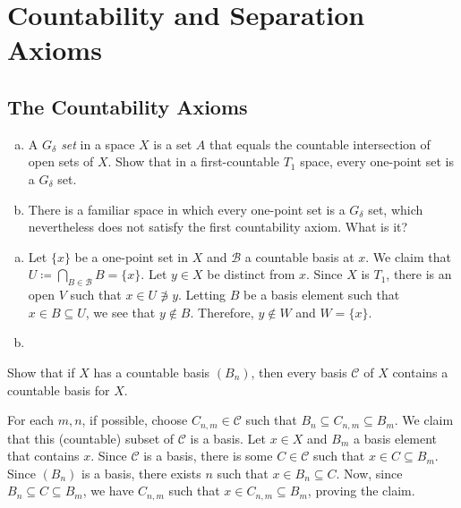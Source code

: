 \section{Countability and Separation Axioms}

\setcounter{subsection}{29}
\subsection{The Countability Axioms}

	\begin{exercise}
		\phantom{oh}
		\begin{enumerate}[(a)]
			\item A \textit{$G_\delta$ set} in a space $X$ is a set $A$ that equals the countable intersection of open sets of $X$. Show that in a first-countable $T_1$ space, every one-point set is a $G_\delta$ set.
			\item There is a familiar space in which every one-point set is a $G_\delta$ set, which nevertheless does not satisfy the first countability axiom. What is it?
		\end{enumerate}
	\end{exercise}
	\begin{solution*}
		\begin{enumerate}[(a)]
			\item Let $\{x\}$ be a one-point set in $X$ and $\mathcal{B}$ a countable basis at $x$. We claim that $U \coloneqq \bigcap_{B\in\mathcal{B}} B = \{x\}$. Let $y\in X$ be distinct from $x$. Since $X$ is $T_1$, there is an open $V$ such that $x\in U\not\ni y$. Letting $B$ be a basis element such that $x\in B\subseteq U$, we see that $y\not\in B$. Therefore, $y\not\in W$ and $W = \{x\}$.
			\item 
		\end{enumerate}
	\end{solution*}

	\begin{exercise}
		Show that if $X$ has a countable basis $(B_n)$, then every basis $\mathcal{C}$ of $X$ contains a countable basis for $X$.
	\end{exercise}
	\begin{solution*}
		For each $m,n$, if possible, choose $C_{n,m}\in\mathcal{C}$ such that $B_n\subseteq C_{n,m}\subseteq B_m$. We claim that this (countable) subset of $\mathcal{C}$ is a basis. Let $x\in X$ and $B_m$ a basis element that contains $x$. Since $\mathcal{C}$ is a basis, there is some $C\in\mathcal{C}$ such that $x\in C\subseteq B_m$. Since $(B_n)$ is a basis, there exists $n$ such that $x\in B_n\subseteq C$. Now, since $B_n\subseteq C\subseteq B_m$, we have $C_{n,m}$ such that $x\in C_{n,m} \subseteq B_m$, proving the claim.
	\end{solution*}

